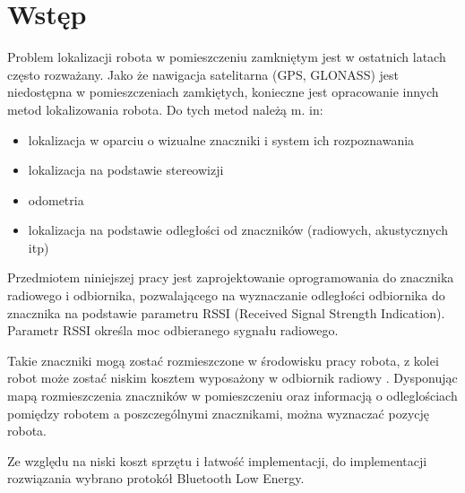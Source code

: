 \chapter{Wstęp}
\label{ch:wstep}

Problem lokalizacji robota w pomieszczeniu zamkniętym jest w ostatnich latach często rozważany. Jako że nawigacja satelitarna (GPS, GLONASS) jest niedostępna w pomieszczeniach zamkiętych, konieczne jest opracowanie innych metod lokalizowania robota. Do tych metod należą m. in:
\begin{itemize}
 \item lokalizacja w oparciu o wizualne znaczniki i system ich rozpoznawania
 \item lokalizacja na podstawie stereowizji
 \item odometria
 \item lokalizacja na podstawie odległości od znaczników (radiowych, akustycznych itp)
\end{itemize}

Przedmiotem niniejszej pracy jest zaprojektowanie oprogramowania do znacznika radiowego i odbiornika, pozwalającego na wyznaczanie odległości odbiornika do znacznika na podstawie parametru RSSI (Received Signal Strength Indication). Parametr RSSI określa moc odbieranego sygnału radiowego.

Takie znaczniki mogą zostać rozmieszczone w środowisku pracy robota, z kolei robot może zostać niskim kosztem wyposażony w odbiornik radiowy \cite{localization}. Dysponując mapą rozmieszczenia znaczników w pomieszczeniu oraz informacją o odleglościach pomiędzy robotem a poszczególnymi znacznikami, można wyznaczać pozycję robota. 

Ze względu na niski koszt sprzętu i łatwość implementacji, do implementacji rozwiązania wybrano protokół Bluetooth Low Energy.
